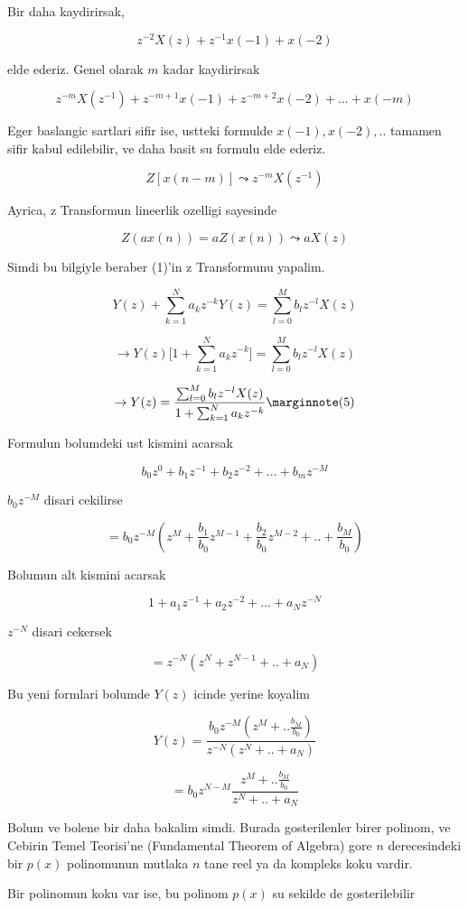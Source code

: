 \documentclass[12pt,fleqn]{article}\usepackage{../common}
\begin{document}
Bir daha kaydirirsak, 

$$ z^{-2}X(z) + z^{-1}x(-1) + x(-2) $$

elde ederiz. Genel olarak $m$ kadar kaydirirsak

$$ z^{-m}X(z^{-1}) + z^{-m+1}x(-1) + z^{-m+2}x(-2) + ... + x(-m) $$

Eger baslangic sartlari sifir ise, ustteki formulde $x(-1),x(-2),..$
tamamen sifir kabul edilebilir, ve daha basit su formulu elde ederiz. 

$$ Z[x(n-m)] \leadsto z^{-m}X(z^{-1})$$

Ayrica, z Transformun lineerlik ozelligi sayesinde 

$$ Z(ax(n)) = aZ(x(n)) \leadsto aX(z) $$

Simdi bu bilgiyle beraber (1)'in z Transformunu yapalim. 

$$ Y(z) + \sum_{k=1}^Na_kz^{-k}Y(z) = \sum_{l=0}^M b_l z^{-l}X(z)  $$

$$ \to Y(z) \bigg[ 1 + \sum_{k=1}^Na_kz^{-k} \bigg] = \sum_{l=0}^M b_l z^{-l}X(z)  $$

$$ \to Y(z)  = \frac{\sum_{l=0}^M b_l z^{-l}X(z) }{ 1 +
  \sum_{k=1}^Na_kz^{-k}} 
\mlabel{5}
$$

Formulun bolumdeki ust kismini acarsak 

$$ b_0z^0 + b_1z^{-1} + b_2z^{-2} + ... + b_mz^{-M} $$

$b_0z^{-M}$ disari cekilirse

$$ = b_0z^{-M}(z^M + \frac{b_1}{b_0}z^{M-1} +  \frac{b_2}{b_0}z^{M-2} +
.. + 
 \frac{b_M}{b_0})
$$

Bolumun alt kismini acarsak 

$$ 1 + a_1z^{-1} + a_2z^{-2} + ... + a_Nz^{-N} $$

$z^{-N}$ disari cekersek 

$$ = z^{-N} ( z^{N} + z^{N-1} + .. + a_N) $$

Bu yeni formlari bolumde $Y(z)$ icinde yerine koyalim

$$ Y(z) = 
\frac{b_0z^{-M}(z^M + ..\frac{b_M}{b_0})}{z^{-N} ( z^{N} + .. + a_N)} 
$$

$$ = b_0 z^{N - M} \frac{z^M + ..\frac{b_M}{b_0}}{z^{N} + .. + a_N }$$

Bolum ve bolene bir daha bakalim simdi. Burada gosterilenler birer polinom,
ve Cebirin Temel Teorisi'ne (Fundamental Theorem of Algebra) gore $n$
derecesindeki bir $p(x)$ polinomunun mutlaka $n$ tane reel ya da kompleks
koku vardir. 

Bir polinomun koku var ise, bu polinom $p(x)$ su sekilde de gosterilebilir
\end{document}
